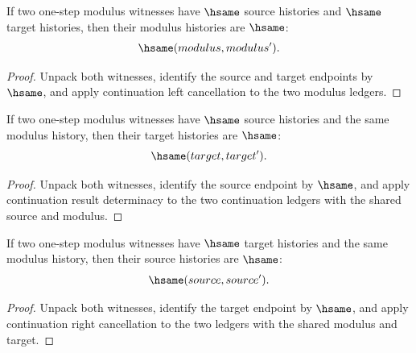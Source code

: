 \begin{theorem}
\label{thm:continuous-modulus-witness-modulus-hsame-deterministic}
If two one-step modulus witnesses have $\hsame$ source histories and $\hsame$ target histories, then their modulus histories are $\hsame$:
$$
\hsame(modulus,modulus').
$$
\end{theorem}
\begin{proof}
Unpack both witnesses, identify the source and target endpoints by $\hsame$, and apply continuation left cancellation to the two modulus ledgers.
\end{proof}

\begin{theorem}
\label{thm:continuous-modulus-witness-target-hsame-deterministic}
If two one-step modulus witnesses have $\hsame$ source histories and the same
modulus history, then their target histories are $\hsame$:
$$
\hsame(target,target').
$$
\end{theorem}
\begin{proof}
Unpack both witnesses, identify the source endpoint by $\hsame$, and apply
continuation result determinacy to the two continuation ledgers with the shared
source and modulus.
\end{proof}

\begin{theorem}
\label{thm:continuous-modulus-witness-source-hsame-deterministic}
If two one-step modulus witnesses have $\hsame$ target histories and the same
modulus history, then their source histories are $\hsame$:
$$
\hsame(source,source').
$$
\end{theorem}
\begin{proof}
Unpack both witnesses, identify the target endpoint by $\hsame$, and apply
continuation right cancellation to the two ledgers with the shared modulus and
target.
\end{proof}

